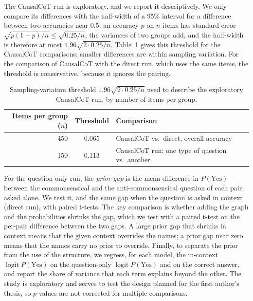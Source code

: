 \documentclass{llncs}
\begin{document}
The CausalCoT run is exploratory, and we report it descriptively. We only compare its differences with the half-width of a 95\% interval for a difference between two accuracies near 0.5: an accuracy $p$ on $n$ items has standard error $\sqrt{p(1-p)/n} \leq \sqrt{0.25/n}$, the variances of two groups add, and the half-width is therefore at most $1.96\sqrt{2 \cdot 0.25/n}$. Table~\ref{tab:threshold} gives this threshold for the CausalCoT comparisons; smaller differences are within sampling variation. For the comparison of CausalCoT with the direct run, which uses the same items, the threshold is conservative, because it ignores the pairing.

\begin{table}[!htbp]
\centering
\caption{Sampling-variation threshold $1.96\sqrt{2 \cdot 0.25/n}$ used to describe the exploratory CausalCoT run, by number of items per group.}
\label{tab:threshold}
\scriptsize
\setlength{\tabcolsep}{8pt}
\begin{tabular}{rcl}
\toprule
Items per group ($n$) & Threshold & Comparison \\
\midrule
450 & 0.065 & CausalCoT vs.\ direct, overall accuracy \\
150 & 0.113 & CausalCoT run: one type of question vs.\ another \\
\bottomrule
\end{tabular}
\end{table}

For the question-only run, the \emph{prior gap} is the mean difference in $P(\text{Yes})$ between the commonsensical and the anti-commonsensical question of each pair, asked alone. We test it, and the same gap when the question is asked in context (direct run), with paired t-tests. The key comparison is whether adding the graph and the probabilities shrinks the gap, which we test with a paired t-test on the per-pair difference between the two gaps. A large prior gap that shrinks in context means that the given context overrides the names; a prior gap near zero means that the names carry no prior to override. Finally, to separate the prior from the use of the structure, we regress, for each model, the in-context $\operatorname{logit} P(\text{Yes})$ on the question-only $\operatorname{logit} P(\text{Yes})$ and on the correct answer, and report the share of variance that each term explains beyond the other. The study is exploratory and serves to test the design planned for the first author's thesis, so $p$-values are not corrected for multiple comparisons.
\end{document}
